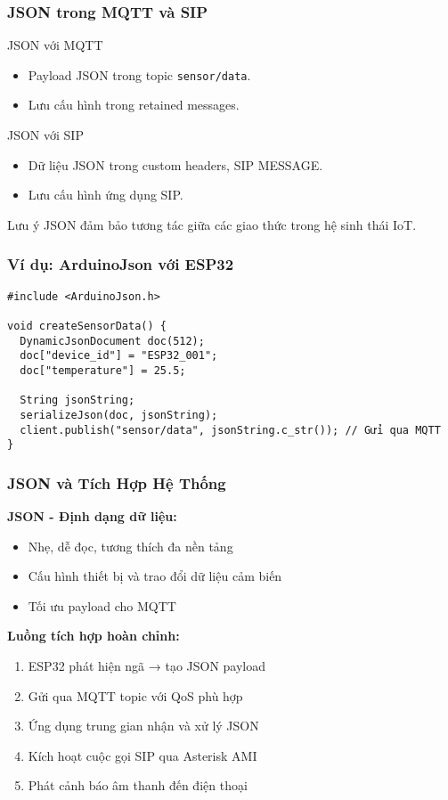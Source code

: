 \begin{frame}
\frametitle{JSON trong MQTT và SIP}
\begin{block}{JSON với MQTT}
\begin{itemize}
\item Payload JSON trong topic \texttt{sensor/data}.
\item Lưu cấu hình trong retained messages.
\end{itemize}
\end{block}

\begin{block}{JSON với SIP}
\begin{itemize}
\item Dữ liệu JSON trong custom headers, SIP MESSAGE.
\item Lưu cấu hình ứng dụng SIP.
\end{itemize}
\end{block}

\begin{alertblock}{Lưu ý}
JSON đảm bảo tương tác giữa các giao thức trong hệ sinh thái IoT.
\end{alertblock}
\end{frame}

\begin{frame}[fragile]
\frametitle{Ví dụ: ArduinoJson với ESP32}
\begin{verbatim}
#include <ArduinoJson.h>

void createSensorData() {
  DynamicJsonDocument doc(512);
  doc["device_id"] = "ESP32_001";
  doc["temperature"] = 25.5;
  
  String jsonString;
  serializeJson(doc, jsonString);
  client.publish("sensor/data", jsonString.c_str()); // Gửi qua MQTT
}
\end{verbatim}
\end{frame}



\begin{frame}
\frametitle{JSON và Tích Hợp Hệ Thống}

\textbf{JSON - Định dạng dữ liệu:}
\begin{itemize}
\item Nhẹ, dễ đọc, tương thích đa nền tảng
\item Cấu hình thiết bị và trao đổi dữ liệu cảm biến
\item Tối ưu payload cho MQTT
\end{itemize}

\textbf{Luồng tích hợp hoàn chỉnh:}
\begin{enumerate}
\item ESP32 phát hiện ngã → tạo JSON payload
\item Gửi qua MQTT topic với QoS phù hợp  
\item Ứng dụng trung gian nhận và xử lý JSON
\item Kích hoạt cuộc gọi SIP qua Asterisk AMI
\item Phát cảnh báo âm thanh đến điện thoại
\end{enumerate}
\end{frame}

